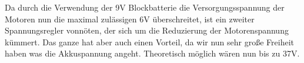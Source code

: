 \begin{flushleft}
    Da durch die Verwendung der 9V Blockbatterie die Versorgungsspannung der Motoren nun die maximal zulässigen 6V
    überschreitet, ist ein zweiter Spannungsregler vonnöten, der sich um die Reduzierung der Motorenspannung kümmert.
    Das ganze hat aber auch einen Vorteil, da wir nun sehr große Freiheit haben was die Akkuspannung angeht. Theoretisch möglich wären nun bis zu 37V.

\end{flushleft}